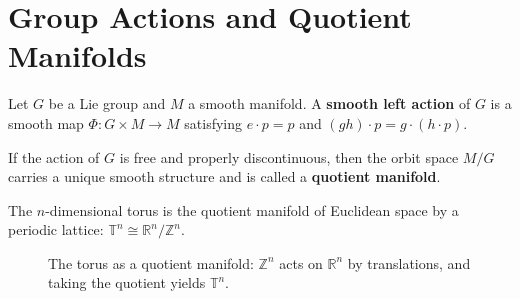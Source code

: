 \section{Group Actions and Quotient Manifolds}

\begin{definition}\label{def:group_action_manifold}
Let $G$ be a Lie group and $M$ a smooth manifold. A \textbf{smooth left action} of $G$ is a smooth map $\Phi: G \times M \to M$ satisfying $e \cdot p = p$ and $(gh) \cdot p = g \cdot (h \cdot p)$.
\end{definition}

\begin{definition}\label{def:quotient_manifold}
If the action of $G$ is free and properly discontinuous, then the orbit space $M/G$ carries a unique smooth structure and is called a \textbf{quotient manifold}.
\end{definition}

\begin{proposition}\label{prop:torus_quotient}
The $n$-dimensional torus is the quotient manifold of Euclidean space by a periodic lattice: $\mathbb{T}^n \cong \mathbb{R}^n / \mathbb{Z}^n$.
\end{proposition}

\begin{figure}[htbp]
\centering
{}
\caption{The torus as a quotient manifold: $\mathbb{Z}^n$ acts on $\mathbb{R}^n$ by translations, and taking the quotient yields $\mathbb{T}^n$.}
\label{fig:torus_quotient}
\end{figure}

